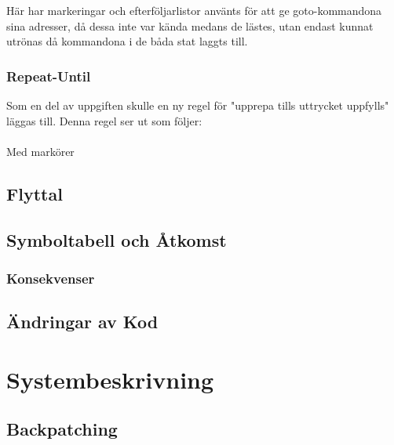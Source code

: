 			Här har markeringar och efterföljarlistor använts för att ge goto-kommandona sina adresser, då
			dessa inte var kända medans de lästes, utan endast kunnat utrönas då kommandona i de båda stat
			laggts till.

		\subsubsection{Repeat-Until}
			Som en del av uppgiften skulle en ny regel för "upprepa tills uttrycket uppfylls" läggas till.
			Denna regel ser ut som följer:\\
\\
			Med markörer 


	\subsection{Flyttal}

	\subsection{Symboltabell och Åtkomst}

		\subsubsection{Konsekvenser}

	\subsection{Ändringar av Kod}



\section{Systembeskrivning}
	\subsection{Backpatching}

